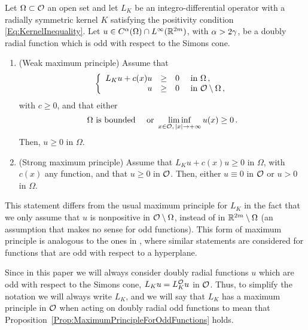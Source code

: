 \begin{proposition}
	\label{Prop:MaximumPrincipleForOddFunctions} Let $\Omega \subset \mathcal{O}$ an open set and let $L_K$ be an integro-differential operator with a radially symmetric kernel $K$ satisfying the positivity condition \eqref{Eq:KernelInequality}.  Let $u\in C^{\alpha}(\Omega)\cap L^\infty(\mathbb{R}^{2m})$, with $\alpha > 2\gamma$, be a doubly radial function which is odd with respect to the Simons cone. 
	
	\begin{enumerate}[label=(\roman{*})]
		\item  (Weak maximum principle)
		Assume that
		$$
		\left\{\begin{array}{rcll}
		L_K u + c(x) u & \geq & 0 & \text{ in } \Omega\,,\\
		u & \geq & 0 & \text{ in } \mathcal{O} \setminus \Omega\,,
		\end{array} \right.
		$$
		with $c \geq 0$, and that either
		$$
		\Omega \text{ is bounded} \quad \text{ or } \liminf_{x \in \mathcal{O},\,|x|\to +\infty} u(x) \geq 0\,.
		$$
		Then, $u \geq 0$ in $\Omega$.
		
		\item (Strong maximum principle)  
		Assume that $L_K u + c(x) u\geq 0$ in $\Omega$, with $c(x)$ any function, and that $u\geq 0$ in $\mathcal{O}$. Then, either $u\equiv 0$ in $\mathcal{O}$ or $u > 0$ in $\Omega$.
	\end{enumerate} 
\end{proposition}

This statement differs from the usual maximum principle for $L_K$ in the fact that we only assume that $u$ is nonpositive in $\mathcal{O}\setminus \Omega$, instead of in $\mathbb{R}^{2m}\setminus \Omega$ (an assumption that makes no sense for odd functions). This form of maximum principle is analogous to the ones in \cite{ChenLiLi, JarohsWeth}, where similar statements are considered for functions that are odd with respect to a hyperplane.

Since in this paper we will always consider doubly radial functions $u$ which are odd with respect to the Simons cone, $L_K u =L_K^{\mathcal{O}} u$ in $\mathcal{O}$. Thus, to simplify the notation we will always write $L_K$, and we will say that $L_K$ has a maximum principle in $\mathcal{O}$ when acting on doubly radial odd functions to mean that Proposition~\ref{Prop:MaximumPrincipleForOddFunctions} holds.


